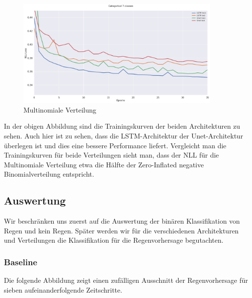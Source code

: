 \begin{figure}[htb]
 \centering
 \includegraphics[width=0.9\textwidth,angle=0]{abb/Categorical.png}
 \caption{Multinomiale Verteilung}
\label{fig:multinomialeVerteilung}
\end{figure}

\noindent In der obigen Abbildung sind die Trainingskurven der beiden Architekturen zu sehen. Auch hier ist zu sehen, dass die LSTM-Architektur der Unet-Architektur überlegen ist und dies eine bessere Performance liefert. Vergleicht man die Trainingskurven für beide Verteilungen sieht man, dass der NLL für die Multinomiale Verteilung etwa die Hälfte der Zero-Inflated negative Binomialverteilung entspricht.

\newpage
\subsection{Auswertung}

Wir beschränken uns zuerst auf die Auswertung der binären Klassifikation von Regen und kein Regen. Später werden wir für die verschiedenen Architekturen und Verteilungen die Klassifikation für die Regenvorhersage begutachten.

\subsubsection{Baseline}

Die folgende Abbildung zeigt einen zufälligen Ausschnitt der Regenvorhersage für sieben aufeinanderfolgende Zeitschritte.\\

